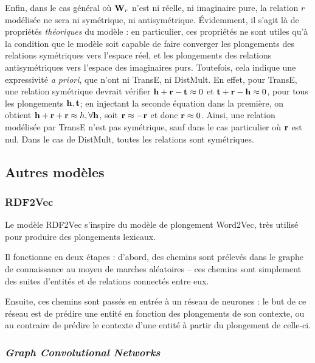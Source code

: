 Enfin, dans le cas général où $\bf{W}_r$ n'est ni réelle, ni imaginaire pure, la relation $r$ modélisée ne sera ni symétrique, ni antisymétrique. Évidemment, il s'agit là de propriétés \textit{théoriques} du modèle : en particulier, ces propriétés ne sont utiles qu'à la condition que le modèle soit capable de faire converger les plongements des relations symétriques vers l'espace réel, et les plongements des relations antisymétriques vers l'espace des imaginaires purs. Toutefois, cela indique une expressivité \textit{a priori}, que n'ont ni TransE, ni DistMult. En effet, pour TransE, une relation symétrique devrait vérifier $\bf{h + r - t} \approx 0$ et $\bf{t + r - h} \approx 0$, pour tous les plongements $\bf{h, t}$; en injectant la seconde équation dans la première, on obtient $\bf{h + r + r} \approx h, \forall \bf{h}$, soit $\bf{r \approx -r}$ et donc $\bf{r} \approx 0$. Ainsi,  une relation modélisée par TransE n'est pas symétrique, sauf dans le cas particulier où $\bf{r}$ est nul. Dans le cas de DistMult, toutes les relations sont symétriques.

\subsection{Autres modèles}
\label{subsec:kge-models-misc}

\subsubsection{RDF2Vec}

Le modèle RDF2Vec s'inspire du modèle de plongement Word2Vec, très utilisé pour produire des plongements lexicaux.

Il fonctionne en deux étapes : d'abord, des chemins sont prélevés dans le graphe de connaissance au moyen de marches aléatoires – ces chemins sont simplement des suites d'entités et de relations connectés entre eux.


Ensuite, ces chemins sont passés en entrée à un réseau de neurones : le but de ce réseau est de prédire une entité en fonction des plongements de son contexte, ou au contraire de prédire le contexte d'une entité à partir du plongement de celle-ci.


\subsubsection{\textit{Graph Convolutional Networks}}

